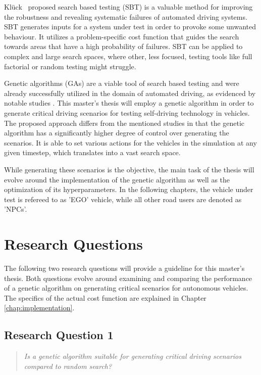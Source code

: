 Klück~\cite{kluck_search-based_2022} proposed search based testing (SBT) is a valuable method for improving the robustness and revealing systematic failures of automated driving systems. SBT generates inputs for a system under test in order to provoke some unwanted behaviour. It utilizes a problem-specific cost function that guides the search towards areas that have a high probability of failures. SBT can be applied to complex and large search spaces, where other, less focused, testing tools like full factorial or random testing might struggle.

Genetic algorithms (GAs) are a viable tool of search based testing and were already successfully utilized in the domain of automated driving, as evidenced by notable studies \cite{felbinger_comparing_2019, klampfl_using_nodate, kaufmann_critical_2021, almanee_scenorita_2021}. This master's thesis will employ a genetic algorithm in order to generate critical driving scenarios for testing self-driving technology in vehicles. The proposed approach differs from the mentioned studies in that the genetic algorithm has a significantly higher degree of control over generating the scenarios. It is able to set various actions for the vehicles in the simulation at any given timestep, which translates into a vast search space. 

While generating these scenarios is the objective, the main task of the thesis will evolve around the implementation of the genetic algorithm as well as the optimization of its hyperparameters. In the following chapters, the vehicle under test is refereed to as 'EGO' vehicle, while all other road users are denoted as 'NPCs'.

\section{Research Questions}
The following two research questions will provide a guideline for this master's thesis. Both questions evolve around examining and comparing the performance of a genetic algorithm on generating critical scenarios for autonomous vehicles. The specifics of the actual cost function are explained in Chapter \ref{chap:implementation}.

\subsection{Research Question 1}
\begin{quote}
	\begin{em}
		\textit{Is a genetic algorithm suitable for generating critical driving scenarios compared to random search?}
	\end{em}
\end{quote}

